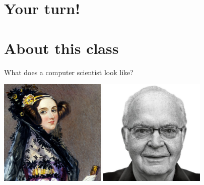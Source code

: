 \documentclass[xcolor={usenames,dvipsnames,svgnames,table},12pt]{beamer}
\begin{document}
\section{Your turn!}

\section{About this class}

\begin{frame}{}
  \begin{center}
    {\Large What does a computer scientist look like?}
  \end{center}
\end{frame}

\begin{frame}{}
  \begin{center}
    \includegraphics[height=2in]{ada-lovelace.jpeg} \quad
    \includegraphics[height=2in]{donald-knuth.jpeg}
  \end{center}
\end{frame}
\end{document}
